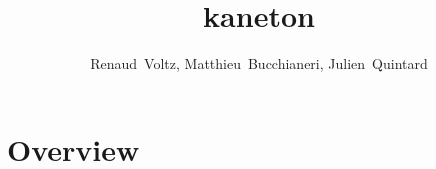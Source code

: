 %
%
%
%
%
%

%
%

\def\path{../..}

%
%



%
%

\title{kaneton}

%
%

\author
{
  Renaud~Voltz,
  Matthieu~Bucchianeri,
  Julien~Quintard
}

%
%



%
%

\begin{frame}
  \titlepage

  \begin{center}
    \logos
  \end{center}
\end{frame}

%
%

\section{Overview}


